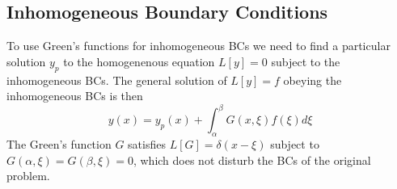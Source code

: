 \subsection{Inhomogeneous Boundary Conditions}
To use Green's functions for inhomogeneous BCs we need to find a particular solution $y_p$
to the homogenenous equation $L[y]=0$ subject to the inhomogeneous BCs. The general
solution of $L[y]=f$ obeying the inhomogeneous BCs is then 
\[y(x)=y_p(x) + \int_{\alpha}^{\beta} G(x,\xi) f(\xi) d\xi\]
The Green's function $G$ satisfies $L[G]=\delta(x-\xi)$ subject to $G(\alpha,
\xi)=G(\beta, \xi)=0$, which does not disturb the BCs of the original problem.

